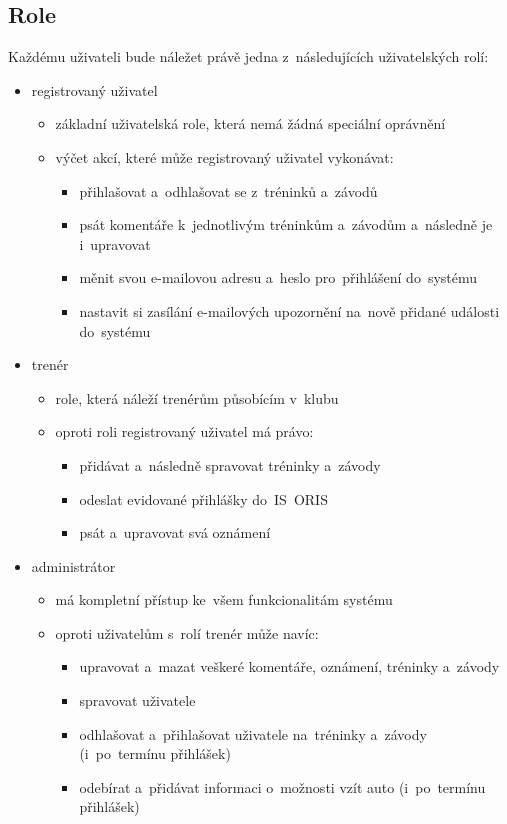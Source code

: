 \subsection{Role}
\label{section:role}
Každému uživateli bude náležet právě jedna z~následujících uživatelských rolí:
\begin{itemize}
	\item registrovaný uživatel
	\begin{itemize}
		\item základní uživatelská role, která nemá žádná speciální oprávnění
		\item výčet akcí, které může registrovaný uživatel vykonávat:
		\begin{itemize}
			\item přihlašovat a~odhlašovat se z~tréninků a~závodů
			\item psát komentáře k~jednotlivým tréninkům a~závodům a~následně je i~upravovat
			\item měnit svou e-mailovou adresu a~heslo pro~přihlášení do~systému
			\item nastavit si zasílání e-mailových upozornění na~nově přidané události do~systému
		\end{itemize}
	\end{itemize}
	\item trenér
	\begin{itemize}
		\item role, která náleží trenérům působícím v~klubu
		\item oproti roli registrovaný uživatel má právo:
		\begin{itemize}
			\item přidávat a~následně spravovat tréninky a~závody
			\item odeslat evidované přihlášky do~IS~ORIS
			\item psát a~upravovat svá oznámení
		\end{itemize}
	\end{itemize}
	\item administrátor
	\begin{itemize}
		\item má kompletní přístup ke~všem funkcionalitám systému
		\item oproti uživatelům s~rolí trenér může navíc:
		\begin{itemize}
			\item upravovat a~mazat veškeré komentáře, oznámení, tréninky a~závody
			\item spravovat uživatele
			\item odhlašovat a~přihlašovat uživatele na~tréninky a~závody (i~po~termínu přihlášek)
			\item odebírat a~přidávat informaci o~možnosti vzít auto (i~po~termínu přihlášek)
		\end{itemize}
	\end{itemize}
\end{itemize}

